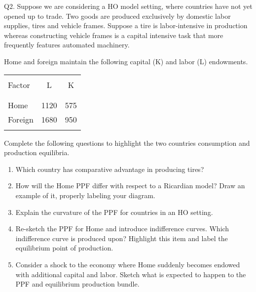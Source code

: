 \documentclass[12pt]{article}
\begin{document}
\newpage

\noindent Q2. Suppose we are considering a HO model setting, where countries have not yet opened up to trade.
Two goods are produced exclusively by domestic labor supplies, tires and vehicle frames.
Suppose a tire is labor-intensive in production whereas constructing vehicle frames is a capital intensive task that more frequently features automated machinery.

\noindent Home and foreign maintain the following capital (K) and labor (L) endowments. 

\begin{table}[!h]
	\centering
	\begin{tabular}[t]{l c c }
		\hline
		&&\\
		Factor & L & K  \\
		&&\\
		\hline
		&&\\
		Home & 1120 & 575  \\
		Foreign & 1680 & 950 \\
		&&\\
		\hline
	\end{tabular}
\end{table}



\noindent Complete the following questions to highlight the two countries consumption and production equilibria. 

\begin{enumerate}[1)]

\item Which country has comparative advantage in producing tires?

\newpage

\item How will the Home PPF differ with respect to a Ricardian model? Draw an example of it, properly labeling your diagram.

\vspace{3.4in}

\item Explain the curvature of the PPF for countries in an HO setting. 

\bigskip

\bigskip

\bigskip

\bigskip

\newpage

\item Re-sketch the PPF for Home and introduce indifference curves. Which indifference curve is produced upon? Highlight this item and label the equilibrium point of production.


\vspace{4.0in}


\item Consider a shock to the economy where Home suddenly becomes endowed with additional capital and labor. Sketch what is expected to happen to the PPF and equilibrium production bundle.

\vspace{4in}

\end{enumerate}
\end{document}
